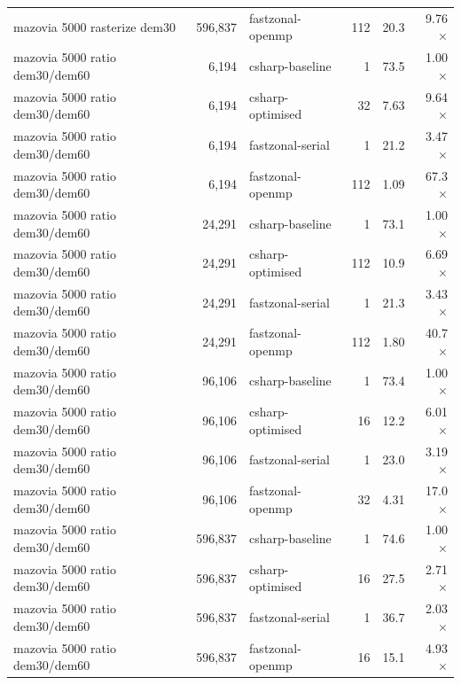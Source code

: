 \begin{tabular}{lrlrrr}
mazovia 5000 rasterize dem30 & 596,837 & fastzonal-openmp & 112 & 20.3 & 9.76$\times$ \\
mazovia 5000 ratio dem30/dem60 & 6,194 & csharp-baseline & 1 & 73.5 & 1.00$\times$ \\
mazovia 5000 ratio dem30/dem60 & 6,194 & csharp-optimised & 32 & 7.63 & 9.64$\times$ \\
mazovia 5000 ratio dem30/dem60 & 6,194 & fastzonal-serial & 1 & 21.2 & 3.47$\times$ \\
mazovia 5000 ratio dem30/dem60 & 6,194 & fastzonal-openmp & 112 & 1.09 & 67.3$\times$ \\
mazovia 5000 ratio dem30/dem60 & 24,291 & csharp-baseline & 1 & 73.1 & 1.00$\times$ \\
mazovia 5000 ratio dem30/dem60 & 24,291 & csharp-optimised & 112 & 10.9 & 6.69$\times$ \\
mazovia 5000 ratio dem30/dem60 & 24,291 & fastzonal-serial & 1 & 21.3 & 3.43$\times$ \\
mazovia 5000 ratio dem30/dem60 & 24,291 & fastzonal-openmp & 112 & 1.80 & 40.7$\times$ \\
mazovia 5000 ratio dem30/dem60 & 96,106 & csharp-baseline & 1 & 73.4 & 1.00$\times$ \\
mazovia 5000 ratio dem30/dem60 & 96,106 & csharp-optimised & 16 & 12.2 & 6.01$\times$ \\
mazovia 5000 ratio dem30/dem60 & 96,106 & fastzonal-serial & 1 & 23.0 & 3.19$\times$ \\
mazovia 5000 ratio dem30/dem60 & 96,106 & fastzonal-openmp & 32 & 4.31 & 17.0$\times$ \\
mazovia 5000 ratio dem30/dem60 & 596,837 & csharp-baseline & 1 & 74.6 & 1.00$\times$ \\
mazovia 5000 ratio dem30/dem60 & 596,837 & csharp-optimised & 16 & 27.5 & 2.71$\times$ \\
mazovia 5000 ratio dem30/dem60 & 596,837 & fastzonal-serial & 1 & 36.7 & 2.03$\times$ \\
mazovia 5000 ratio dem30/dem60 & 596,837 & fastzonal-openmp & 16 & 15.1 & 4.93$\times$ \\
\bottomrule
\end{tabular}
